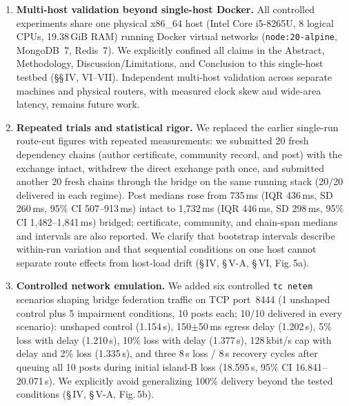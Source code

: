 \documentclass[10pt,a4paper]{article}
\begin{document}
\begin{enumerate}
  \item \textbf{Multi-host validation beyond single-host Docker.}
  All controlled experiments share one physical x86\_64 host (Intel Core i5-8265U, 8 logical CPUs, 19.38\,GiB RAM) running Docker virtual networks (\texttt{node:20-alpine}, MongoDB~7, Redis~7). We explicitly confined all claims in the Abstract, Methodology, Discussion/Limitations, and Conclusion to this single-host testbed (\S\S\,IV, VI--VII). Independent multi-host validation across separate machines and physical routers, with measured clock skew and wide-area latency, remains future work.

  \item \textbf{Repeated trials and statistical rigor.}
  We replaced the earlier single-run route-cut figures with repeated measurements: we submitted 20 fresh dependency chains (author certificate, community record, and post) with the exchange intact, withdrew the direct exchange path once, and submitted another 20 fresh chains through the bridge on the same running stack (20/20 delivered in each regime). Post medians rose from 735\,ms (IQR 436\,ms, SD 260\,ms, 95\% CI 507--913\,ms) intact to 1,732\,ms (IQR 446\,ms, SD 298\,ms, 95\% CI 1,482--1,841\,ms) bridged; certificate, community, and chain-span medians and intervals are also reported. We clarify that bootstrap intervals describe within-run variation and that sequential conditions on one host cannot separate route effects from host-load drift (\S\,IV, \S\,V-A, \S\,VI, Fig.\,5a).

  \item \textbf{Controlled network emulation.}
  We added six controlled \texttt{tc netem} scenarios shaping bridge federation traffic on TCP port~8444 (1 unshaped control plus 5 impairment conditions, 10 posts each; 10/10 delivered in every scenario): unshaped control (1.154\,s), 150$\pm$50\,ms egress delay (1.202\,s), 5\% loss with delay (1.210\,s), 10\% loss with delay (1.377\,s), 128\,kbit/s cap with delay and 2\% loss (1.335\,s), and three 8\,s loss / 8\,s recovery cycles after queuing all 10 posts during initial island-B loss (18.595\,s, 95\% CI 16.841--20.071\,s). We explicitly avoid generalizing 100\% delivery beyond the tested conditions (\S\,IV, \S\,V-A, Fig.\,5b).


\end{enumerate}
\end{document}
